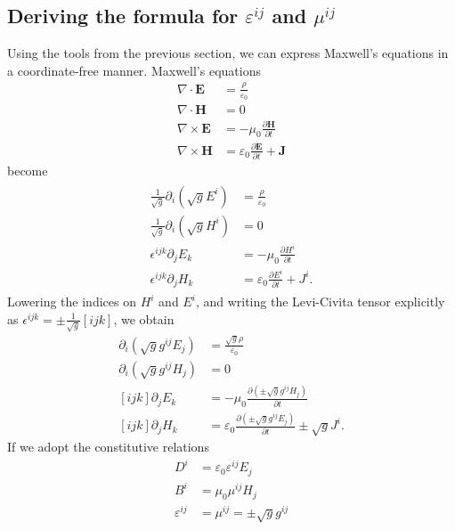 \subsection{Deriving the formula for \(\varepsilon^{ij}\) and \(\mu^{ij}\)}
Using the tools from the previous section, we can express Maxwell's equations in a
coordinate-free manner.
Maxwell's equations
\begin{align*}
\nabla \cdot \boldsymbol{E} &= \frac{\rho}{\varepsilon_0}\\
\nabla \cdot \boldsymbol{H} &= 0\\
\nabla\times \boldsymbol{E} &=-\mu_0\frac{\partial \boldsymbol{H}}{\partial t}\\
\nabla\times \boldsymbol{H} &=\varepsilon_0\frac{\partial \boldsymbol{E}}{\partial t} + \boldsymbol{J}
\end{align*}
become
\begin{align}
\begin{split}\label{maxwellGeneral}
\frac{1}{\sqrt{g}}\partial_i\left(\sqrt{g}E^i\right) &= \frac{\rho}{\varepsilon_0}\\
\frac{1}{\sqrt{g}}\partial_i\left(\sqrt{g}H^i\right) &=0 \\
\epsilon^{ijk} \partial_jE_k &= -\mu_0\frac{\partial H^i}{\partial t}\\
\epsilon^{ijk} \partial_jH_k &= \varepsilon_0\frac{\partial E^i}{\partial t} + J^i.
\end{split}
\end{align}
Lowering the indices on \(H^i\) and \(E^i\), and writing the Levi-Civita tensor explicitly as
\(\epsilon^{ijk}=\pm\frac{1}{\sqrt{g}}[ijk]\), we obtain
\begin{align*}
\partial_i\left(\sqrt{g}g^{ij}E_j\right) &= \frac{\sqrt{g}\rho}{\varepsilon_0}\\
\partial_i\left(\sqrt{g}g^{ij}H_j\right) &=0\\
[ijk]\partial_jE_k &= -\mu_0\frac{\partial\left(\pm \sqrt{g}g^{ij}H_j\right)}{\partial t}\\
[ijk]\partial_jH_k &= \varepsilon_0\frac{\partial \left(\pm \sqrt{g}g^{ij}E_j\right)}{\partial t} \pm \sqrt{g}J^i.
\end{align*}
If we adopt the constitutive relations 
\begin{align}
D^i&=\varepsilon_0\varepsilon^{ij}E_j \nonumber\\
B^i&=\mu_0\mu^{ij}H_j \nonumber\\
\varepsilon^{ij}&=\mu^{ij}=\pm\sqrt{g}g^{ij}\label{cartesiantensors}
\end{align}
